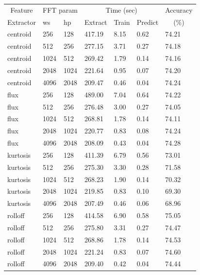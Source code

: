 \documentclass[12pt,oneside]{book}
\begin{document}
\begin{table}
\begin{tabular}{|l|l|l|l|l|l|l|}
\hline
\multicolumn{1}{|c|}{Feature} &\multicolumn{2}{c|}{FFT param} & \multicolumn{3}{c|}{Time (sec)} & Accuracy \\
\hhline{|~|-|-|-|-|-|~|}
Extractor & ws & hp & Extract & Train & Predict & \multicolumn{1}{c|}{(\%)} \\
\hhline{|=|=|=|=|=|=|=|}
centroid & 256 & 128    &   417.19  &    8.15  &   0.62  &  74.21  \\
centroid & 512 & 256    &   277.15  &    3.71  &   0.27  &  74.18  \\
centroid & 1024 & 512   &   269.42  &    1.79  &   0.14  &  74.16  \\
centroid & 2048 & 1024  &   221.64  &    0.95  &   0.07  &  74.20  \\
centroid & 4096 & 2048  &   209.47  &    0.46  &   0.04  &  74.24  \\
\hline
flux & 256 & 128        &   489.00  &    7.04  &   0.64  &  74.22  \\
flux & 512 & 256        &   276.48  &    3.00  &   0.27  &  74.05  \\
flux & 1024 & 512       &   268.81  &    1.78  &   0.14  &  74.11  \\
flux & 2048 & 1024      &   220.77  &    0.83  &   0.08  &  74.24  \\
flux & 4096 & 2048      &   208.09  &    0.43  &   0.04  &  74.28  \\
\hline
kurtosis & 256 & 128    &   411.39  &    6.79  &   0.56  &  73.01  \\
kurtosis & 512 & 256    &   275.30  &    3.30  &   0.28  &  71.58  \\
kurtosis & 1024 & 512   &   268.23  &    1.90  &   0.14  &  70.32  \\
kurtosis & 2048 & 1024  &   219.85  &    0.83  &   0.10  &  69.30  \\
kurtosis & 4096 & 2048  &   207.49  &    0.46  &   0.06  &  68.96  \\
\hline
rolloff & 256 & 128     &   414.58  &    6.90  &   0.58  &  75.05  \\
rolloff & 512 & 256     &   275.80  &    3.31  &   0.27  &  74.47  \\
rolloff & 1024 & 512    &   268.86  &    1.78  &   0.14  &  74.53  \\
rolloff & 2048 & 1024   &   221.24  &    0.83  &   0.07  &  74.60  \\
rolloff & 4096 & 2048   &   209.40  &    0.42  &   0.04  &  74.44  \\

\end{tabular}
\end{table}
\end{document}
